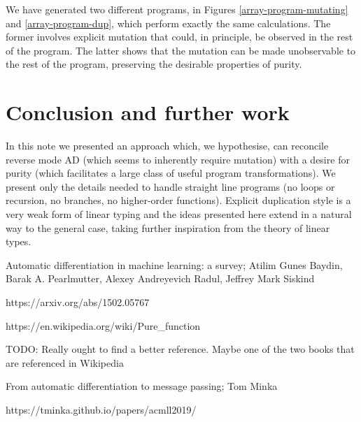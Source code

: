 \documentclass[12pt]{article}
\begin{document}
We have generated two different programs, in Figures
\ref{array-program-mutating} and \ref{array-program-dup}, which
perform exactly the same calculations.  The former involves explicit
mutation that could, in principle, be observed in the rest of the
program.  The latter shows that the mutation can be made unobservable
to the rest of the program, preserving the desirable properties of
purity.

\section{Conclusion and further work}

In this note we presented an approach which, we hypothesise, can
reconcile reverse mode AD (which seems to inherently require mutation)
with a desire for purity (which facilitates a large class of useful
program transformations).  We present only the details needed to
handle straight line programs (no loops or recursion, no branches, no
higher-order functions).  Explicit duplication style is a very weak
form of linear typing and the ideas presented here extend in a natural
way to the general case, taking further inspiration from the theory of
linear types.






\begin{thebibliography}{9}

  Automatic differentiation in machine learning: a survey;
  Atilim Gunes Baydin, Barak A. Pearlmutter, Alexey Andreyevich Radul, Jeffrey Mark Siskind
  
https://arxiv.org/abs/1502.05767
  
  https://en.wikipedia.org/wiki/Pure\_function

  TODO: Really ought to find a better reference.  Maybe one of the two
  books that are referenced in Wikipedia

  From automatic differentiation to message passing; Tom Minka

  https://tminka.github.io/papers/acmll2019/

\end{thebibliography}
\end{document}
